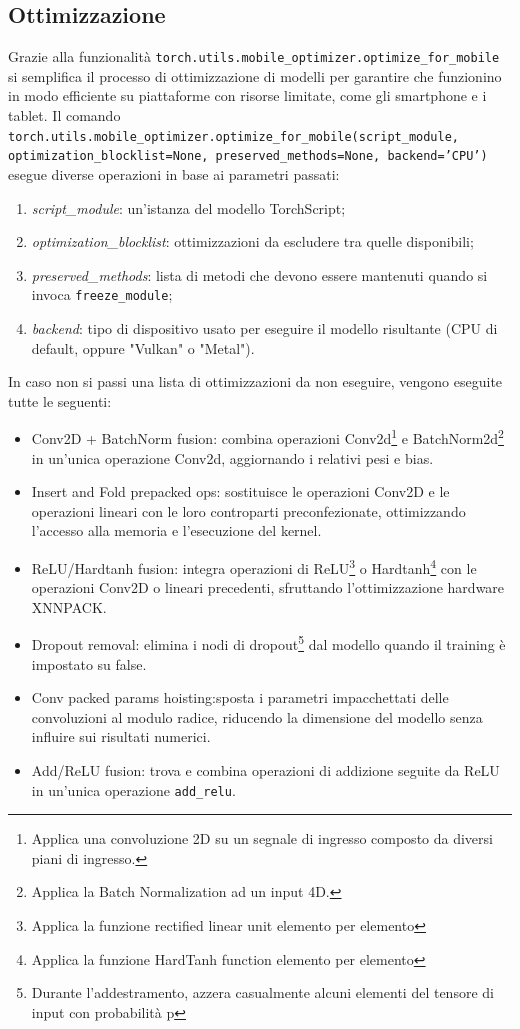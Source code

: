 \subsection{Ottimizzazione}
Grazie alla funzionalità \texttt{torch.utils.mobile\_optimizer.optimize\_for\_mobile}\cite{Ottimizzazione} si semplifica il processo di ottimizzazione
di modelli per garantire che funzionino in modo efficiente su piattaforme con risorse limitate, come gli smartphone e i tablet.
Il comando \texttt{torch.utils.mobile\_optimizer.optimize\_for\_mobile(script\_module, optimization\_blocklist=None, preserved\_methods=None, backend='CPU')} esegue
diverse operazioni in base ai parametri passati:
\begin{enumerate}
    \item \textit{script\_module}: un'istanza del modello TorchScript;
    \item \textit{optimization\_blocklist}: ottimizzazioni da escludere tra quelle disponibili;
    \item \textit{preserved\_methods}: lista di metodi che devono essere mantenuti quando si invoca \texttt{freeze\_module};
    \item \textit{backend}: tipo di dispositivo usato per eseguire il modello risultante (CPU di default, oppure "Vulkan" o "Metal").
\end{enumerate}

In caso non si passi una lista di ottimizzazioni da non eseguire, vengono eseguite tutte le seguenti:
\begin{itemize}
    \item Conv2D + BatchNorm fusion: combina operazioni Conv2d\footnote{Applica una convoluzione 2D su un segnale di ingresso composto da diversi piani di ingresso.}
    e BatchNorm2d\footnote{Applica la Batch Normalization ad un input 4D.} in un'unica operazione Conv2d, aggiornando i relativi pesi e bias.
    \item Insert and Fold prepacked ops: sostituisce le operazioni Conv2D e le operazioni lineari con le loro controparti preconfezionate, ottimizzando l'accesso alla memoria e l'esecuzione del kernel.
    \item ReLU/Hardtanh fusion: integra operazioni di ReLU\footnote{Applica la funzione rectified linear unit elemento per elemento} o
    Hardtanh\footnote{Applica la funzione HardTanh function elemento per elemento} con le operazioni Conv2D o lineari precedenti, sfruttando l'ottimizzazione hardware XNNPACK.
    \item Dropout removal: elimina i nodi di dropout\footnote{Durante l'addestramento, azzera casualmente alcuni elementi del tensore di input
    con probabilità p} dal modello quando il training è impostato su false.
    \item Conv packed params hoisting:sposta i parametri impacchettati delle convoluzioni al modulo radice, riducendo la dimensione del modello senza
    influire sui risultati numerici.
    \item Add/ReLU fusion: trova e combina operazioni di addizione seguite da ReLU in un'unica operazione \texttt{add\_relu}.
\end{itemize}

